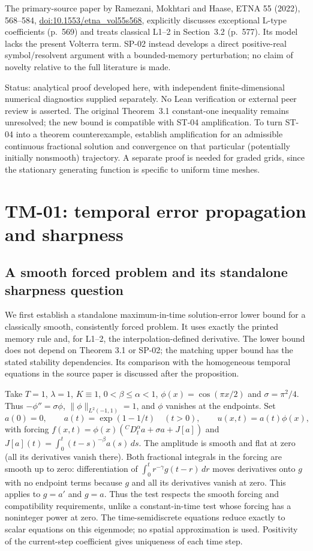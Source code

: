 \documentclass[11pt,a4paper]{amsart}
\theoremstyle{remark}
\theoremstyle{plain}
\theoremstyle{remark}
\numberwithin{equation}{section}
\begin{document}
The primary-source paper by Ramezani, Mokhtari and Haase, ETNA 55 (2022), 568--584, \href{https://doi.org/10.1553/etna_vol55s568}{doi:10.1553/etna\_vol55s568}, explicitly discusses exceptional L-type coefficients (p.~569) and treats classical L1--2 in Section~3.2 (p.~577). Its model lacks the present Volterra term. SP-02 instead develops a direct positive-real symbol/resolvent argument with a bounded-memory perturbation; no claim of novelty relative to the full literature is made.

Status: analytical proof developed here, with independent finite-dimensional numerical diagnostics supplied separately. No Lean verification or external peer review is asserted. The original Theorem~3.1 constant-one inequality remains unresolved; the new bound is compatible with ST-04 amplification. To turn ST-04 into a theorem counterexample, establish amplification for an admissible continuous fractional solution and convergence on that particular (potentially initially nonsmooth) trajectory. A separate proof is needed for graded grids, since the stationary generating function is specific to uniform time meshes.


\section{TM-01: temporal error propagation and sharpness}
\label{sec:tm01}

\subsection{A smooth forced problem and its standalone sharpness question}
We first establish a standalone maximum-in-time solution-error lower bound for a classically smooth, consistently forced problem. It uses exactly the printed memory rule and, for L1--2, the interpolation-defined derivative. The lower bound does not depend on Theorem 3.1 or SP-02; the matching upper bound has the stated stability dependencies. Its comparison with the homogeneous temporal equations in the source paper is discussed after the proposition.

Take $T=1$, $\lambda=1$, $K\equiv1$, $0<\beta\le\alpha<1$, $\phi(x)=\cos(\pi x/2)$ and $\sigma=\pi^2/4$. Thus $-\phi''=\sigma\phi$, $\|\phi\|_{L^2(-1,1)}=1$, and $\phi$ vanishes at the endpoints. Set
\[
 a(0)=0,\qquad a(t)=\exp(1-1/t)\quad(t>0),\qquad u(x,t)=a(t)\phi(x),
\]
with forcing $f(x,t)=\phi(x)({}^CD_t^\alpha a+\sigma a+J[a])$ and $J[a](t)=\int_0^t(t-s)^{-\beta}a(s)\,ds$. The amplitude is smooth and flat at zero (all its derivatives vanish there). Both fractional integrals in the forcing are smooth up to zero: differentiation of $\int_0^t r^{-\gamma}g(t-r)\,dr$ moves derivatives onto $g$ with no endpoint terms because $g$ and all its derivatives vanish at zero. This applies to $g=a'$ and $g=a$. Thus the test respects the smooth forcing and compatibility requirements, unlike a constant-in-time test whose forcing has a noninteger power at zero. The time-semidiscrete equations reduce exactly to scalar equations on this eigenmode; no spatial approximation is used. Positivity of the current-step coefficient gives uniqueness of each time step.
\end{document}

